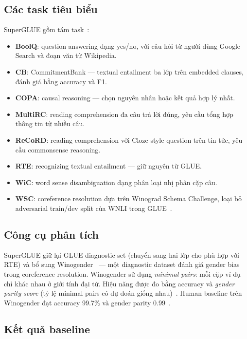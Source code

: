 \subsection{Các task tiêu biểu}

SuperGLUE gồm tám task~\cite{superglue}:

\begin{itemize}
    \item \textbf{BoolQ}: question answering dạng yes/no, với câu hỏi từ người dùng Google Search và đoạn văn từ Wikipedia.
    \item \textbf{CB}: CommitmentBank --- textual entailment ba lớp trên embedded clauses, đánh giá bằng accuracy và F1.
    \item \textbf{COPA}: causal reasoning --- chọn nguyên nhân hoặc kết quả hợp lý nhất.
    \item \textbf{MultiRC}: reading comprehension đa câu trả lời đúng, yêu cầu tổng hợp thông tin từ nhiều câu.
    \item \textbf{ReCoRD}: reading comprehension với Cloze-style question trên tin tức, yêu cầu commonsense reasoning.
    \item \textbf{RTE}: recognizing textual entailment --- giữ nguyên từ GLUE.
    \item \textbf{WiC}: word sense disambiguation dạng phân loại nhị phân cặp câu.
    \item \textbf{WSC}: coreference resolution dựa trên Winograd Schema Challenge, loại bỏ adversarial train/dev split của WNLI trong GLUE~\cite{superglue}.
\end{itemize}

\subsection{Công cụ phân tích}

SuperGLUE giữ lại GLUE diagnostic set (chuyển sang hai lớp cho phù hợp với RTE) và bổ sung Winogender~\cite{superglue} --- một diagnostic dataset đánh giá gender bias trong coreference resolution. Winogender sử dụng \textit{minimal pairs}: mỗi cặp ví dụ chỉ khác nhau ở giới tính đại từ. Hiệu năng được đo bằng accuracy và \textit{gender parity score} (tỷ lệ minimal pairs có dự đoán giống nhau)~\cite{superglue}. Human baseline trên Winogender đạt accuracy 99.7\% và gender parity 0.99~\cite{superglue}.

\subsection{Kết quả baseline}

